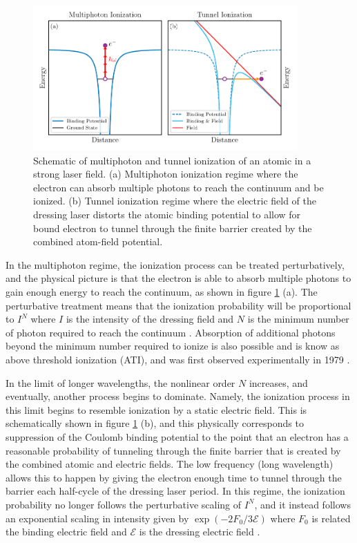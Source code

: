\begin{figure}
	\centering
	\includegraphics[width=0.9\textwidth]{figures/ATS/MPI_Tunneling.pdf}
	\caption[Schematic of multiphoton and tunnel ionization]{Schematic of multiphoton and tunnel ionization of an atomic in a strong laser field. (a) Multiphoton ionization regime where the electron can absorb multiple photons to reach the continuum and be ionized.  (b) Tunnel ionization regime where the electric field of the dressing laser distorts the atomic binding potential to allow for  bound electron to tunnel through the finite barrier created by the combined atom-field potential.}
	\label{fig:mpi_tunnel}
\end{figure}

In the multiphoton regime, the ionization process can be treated perturbatively, and the physical picture is that the electron is able to absorb multiple photons to gain enough energy to reach the continuum, as shown in figure \ref{fig:mpi_tunnel} (a).  The perturbative treatment means that the ionization probability will be proportional to $I^N$ where $I$ is the intensity of the dressing field and $N$ is the minimum number of photon required to reach the continuum \cite{boydNonlinearOptics2008}.  Absorption of additional photons beyond the minimum number required to ionize is also possible and is know as above threshold ionization (ATI), and was first observed experimentally in 1979 \cite{agostiniFreeFreeTransitionsFollowing1979}.

In the limit of longer wavelengths, the nonlinear order $N$ increases, and eventually, another process begins to dominate.  Namely, the ionization process in this limit begins to resemble ionization by a static electric field.  This is schematically shown in figure \ref{fig:mpi_tunnel} (b), and this physically corresponds to suppression of the Coulomb binding potential to the point that an electron has a reasonable probability of tunneling through the finite barrier that is created by the combined atomic and electric fields. The low frequency (long wavelength) allows this to happen by giving the electron enough time to tunnel through the barrier each half-cycle of the dressing laser period.  In this regime, the ionization probability no longer follows the perturbative scaling of $I^N$, and it instead follows an exponential scaling in intensity given by $\exp(-2F_0/3\mathcal{E})$ where $F_0$ is related the binding electric field and $\mathcal{E}$ is the dressing electric field \cite{keldyshIonizationFieldStrong1965,changFundamentalsAttosecondOptics2011}. 

